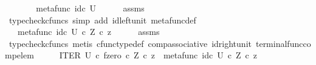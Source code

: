 \begin{isabellebody}
\ \ \isamarkupfalse%
\ \isamarkupfalse%
\ {\isachardoublequoteopen}{\isachardot}{\kern0pt}{\isachardot}{\kern0pt}{\isachardot}{\kern0pt}\ {\isacharequal}{\kern0pt}\ {\isacharparenleft}{\kern0pt}metafunc\ {\isacharparenleft}{\kern0pt}id\isactrlsub c\ U{\isacharparenright}{\kern0pt}{\isacharparenright}{\kern0pt}{\isachardoublequoteclose}\isanewline
\ \ \ \ \isamarkupfalse%
\ assms\ \isamarkupfalse%
\ {\isacharparenleft}{\kern0pt}typecheck{\isacharunderscore}{\kern0pt}cfuncs{\isacharcomma}{\kern0pt}\ simp\ add{\isacharcolon}{\kern0pt}\ id{\isacharunderscore}{\kern0pt}left{\isacharunderscore}{\kern0pt}unit{}\ metafunc{\isacharunderscore}{\kern0pt}def{}{\isacharparenright}{\kern0pt}\isanewline
\ \ \isamarkupfalse%
\ \isamarkupfalse%
\ {\isachardoublequoteopen}{\isachardot}{\kern0pt}{\isachardot}{\kern0pt}{\isachardot}{\kern0pt}\ {\isacharequal}{\kern0pt}\ {\isacharparenleft}{\kern0pt}metafunc\ {\isacharparenleft}{\kern0pt}id\isactrlsub c\ U{\isacharparenright}{\kern0pt}\ {\isasymcirc}\isactrlsub c\ {\isasymbeta}\isactrlbsub Z\isactrlesub {\isacharparenright}{\kern0pt}\ {\isasymcirc}\isactrlsub c\ z{\isachardoublequoteclose}\isanewline
\ \ \ \ \isamarkupfalse%
\ assms\ \isamarkupfalse%
\ {\isacharparenleft}{\kern0pt}typecheck{\isacharunderscore}{\kern0pt}cfuncs{\isacharcomma}{\kern0pt}\ metis\ cfunc{\isacharunderscore}{\kern0pt}type{\isacharunderscore}{\kern0pt}def\ comp{\isacharunderscore}{\kern0pt}associative\ id{\isacharunderscore}{\kern0pt}right{\isacharunderscore}{\kern0pt}unit{}\ terminal{\isacharunderscore}{\kern0pt}func{\isacharunderscore}{\kern0pt}comp{\isacharunderscore}{\kern0pt}elem{\isacharparenright}{\kern0pt}\isanewline
\ \ \isamarkupfalse%
\ \isamarkupfalse%
\ {\isachardoublequoteopen}{\isacharparenleft}{\kern0pt}ITER\ U\ {\isasymcirc}\isactrlsub c\ {\isasymlangle}f{\isacharcomma}{\kern0pt}zero\ {\isasymcirc}\isactrlsub c\ {\isasymbeta}\isactrlbsub Z\isactrlesub {\isasymrangle}{\isacharparenright}{\kern0pt}\ {\isasymcirc}\isactrlsub c\ z\ {\isacharequal}{\kern0pt}\ {\isacharparenleft}{\kern0pt}metafunc\ {\isacharparenleft}{\kern0pt}id\isactrlsub c\ U{\isacharparenright}{\kern0pt}\ {\isasymcirc}\isactrlsub c\ {\isasymbeta}\isactrlbsub Z\isactrlesub {\isacharparenright}{\kern0pt}\ {\isasymcirc}\isactrlsub c\ z{\isachardoublequoteclose}\isacommand{{\isachardot}{\kern0pt}}\isamarkupfalse%
\isanewline
{}\isamarkupfalse%
%
\endisatagproof

\end{isabellebody}
